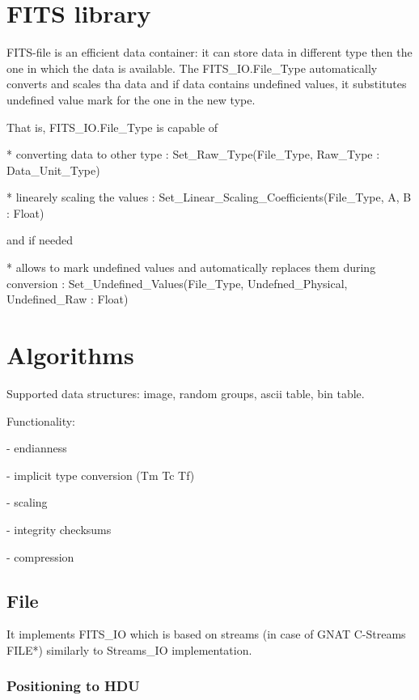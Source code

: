 \documentclass[a4paper,10pt]{article}
\begin{document}
\tableofcontents

\section{FITS library}

FITS-file is an efficient data container:
it can store data in different type then the one in which the data is available.
The FITS\_IO.File\_Type automatically converts and scales tha data and if data
contains undefined values, it substitutes undefined value mark for the one in the new type.


That is, FITS\_IO.File\_Type is capable of

* converting data to other type : Set\_Raw\_Type(File\_Type, Raw\_Type : Data\_Unit\_Type)

* linearely scaling the values : Set\_Linear\_Scaling\_Coefficients(File\_Type, A, B : Float)

and if needed

* allows to mark undefined values and automatically replaces them during conversion
: Set\_Undefined\_Values(File\_Type, Undefned\_Physical, Undefined\_Raw : Float)



\section{Algorithms}

Supported data structures: image, random groups, ascii table, bin table.

Functionality:

- endianness

- implicit type conversion (Tm Tc Tf)

- scaling

- integrity checksums

- compression



\subsection{File}
It implements FITS\_IO which is based on streams (in case of GNAT C-Streams FILE*) similarly to Streams\_IO implementation.



\subsubsection{Positioning to HDU}
\end{document}

